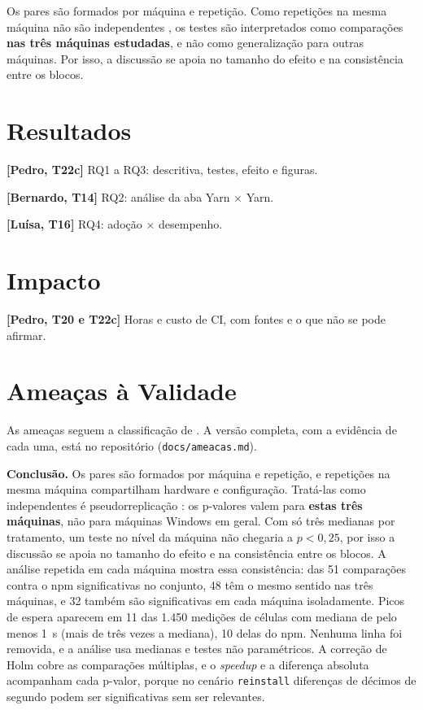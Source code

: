 \documentclass[12pt]{article}
\newcommand{\pendente}[2]{\textcolor{red!70!black}{\textbf{[#1]} #2}}
\begin{document}
Os pares são formados por máquina e repetição. Como repetições na mesma máquina não são independentes
\cite{hurlbert1984}, os testes são interpretados como comparações \textbf{nas três máquinas
estudadas}, e não como generalização para outras máquinas. Por isso, a discussão se apoia no tamanho
do efeito e na consistência entre os blocos.

\section{Resultados}
\label{sec:resultados}

\pendente{Pedro, T22c}{RQ1 a RQ3: descritiva, testes, efeito e figuras.}

\pendente{Bernardo, T14}{RQ2: análise da aba Yarn $\times$ Yarn.}

\pendente{Luísa, T16}{RQ4: adoção $\times$ desempenho.}

\section{Impacto}
\label{sec:impacto}

\pendente{Pedro, T20 e T22c}{Horas e custo de CI, com fontes e o que não se pode afirmar.}

\section{Ameaças à Validade}
\label{sec:ameacas}

As ameaças seguem a classificação de \cite{wohlin2012}. A versão completa, com a evidência de cada
uma, está no repositório (\texttt{docs/ameacas.md}).

\textbf{Conclusão.} Os pares são formados por máquina e repetição, e repetições na mesma máquina
compartilham hardware e configuração. Tratá-las como independentes é pseudorreplicação
\cite{hurlbert1984}: os p-valores valem para \textbf{estas três máquinas}, não para máquinas
Windows em geral. Com só três medianas por tratamento, um teste no nível da máquina não chegaria a
$p < 0{,}25$, por isso a discussão se apoia no tamanho do efeito e na consistência entre os blocos.
A análise repetida em cada máquina mostra essa consistência: das 51 comparações contra o npm
significativas no conjunto, 48 têm o mesmo sentido nas três máquinas, e 32 também são
significativas em cada máquina isoladamente.
Picos de espera aparecem em 11 das 1.450 medições de células com mediana de pelo menos 1~s (mais de
três vezes a mediana), 10 delas do npm. Nenhuma linha foi removida, e a análise usa medianas e
testes não paramétricos. A correção de Holm cobre as comparações múltiplas, e o
\textit{speedup} e a diferença absoluta acompanham cada p-valor, porque no cenário
\texttt{reinstall} diferenças de décimos de segundo podem ser significativas sem ser relevantes.
\end{document}
